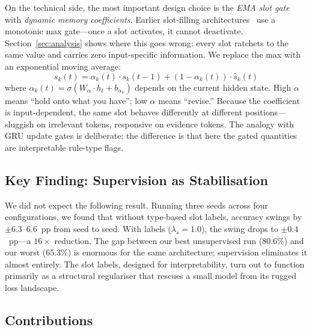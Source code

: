 \documentclass[conference]{IEEEtran}
\begin{document}
On the technical side, the most important design choice is the
\emph{EMA slot gate} with \emph{dynamic memory coefficients}.
Earlier slot-filling architectures~\cite{bao2022slot} use a
monotonic max gate---once a slot activates, it cannot deactivate.
Section~\ref{sec:analysis} shows where this goes wrong:
every slot ratchets to the same value and carries zero
input-specific information. We replace the max with an exponential
moving average:
\begin{equation}
    s_k(t) = \alpha_k(t) \cdot s_k(t{-}1) + (1 - \alpha_k(t)) \cdot \hat{s}_k(t)
\label{eq:ema_intro}
\end{equation}
where $\alpha_k(t) = \sigma(W_\alpha \cdot h_t + b_{\alpha_k})$
depends on the current hidden state. High $\alpha$ means ``hold
onto what you have''; low $\alpha$ means ``revise.''  Because the
coefficient is input-dependent, the same slot behaves differently at
different positions---sluggish on irrelevant tokens, responsive on
evidence tokens. The analogy with GRU update gates is deliberate;
the difference is that here the gated quantities are interpretable
rule-type flags.

\subsection{Key Finding: Supervision as Stabilisation}

We did not expect the following result. Running three seeds across
four configurations, we found that without type-based slot labels,
accuracy swings by $\pm 6.3$--$6.6$~pp from seed to seed.
With labels ($\lambda_s{=}1.0$), the swing drops to $\pm 0.4$~pp---a
$16\times$ reduction. The gap between our best unsupervised run
(80.6\%) and our worst (65.3\%) is enormous for the same
architecture; supervision eliminates it almost entirely.
The slot labels, designed for interpretability, turn out to function
primarily as a structural regulariser that rescues a small model
from its rugged loss landscape.

\subsection{Contributions}
\end{document}
